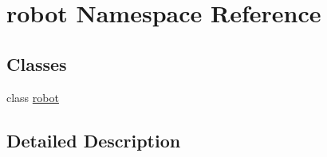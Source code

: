 \hypertarget{namespacerobot}{\section{robot Namespace Reference}
\label{namespacerobot}
}
\subsection*{Classes}
\begin{DoxyCompactItemize}
\item 
class \hyperlink{classrobot_1_1robot}{robot}
\end{DoxyCompactItemize}


\subsection{Detailed Description}
